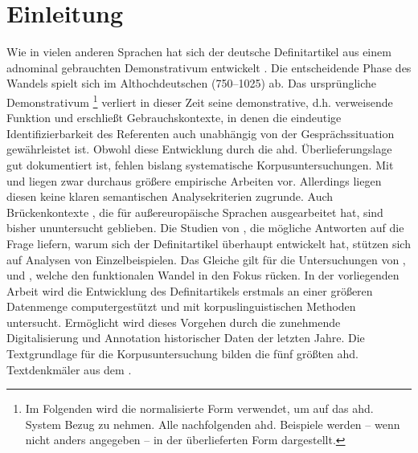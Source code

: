 \chapter{Einleitung}

Wie in vielen anderen Sprachen hat sich der deutsche Definitartikel aus einem adnominal gebrauchten Demonstrativum entwickelt  \parencite{Oubouzar1992,Szczepaniak2011a}. Die entscheidende Phase des Wandels spielt sich im Althochdeutschen (750--1025) ab. Das ursprüngliche Demonstrativum \footnote{Im Folgenden wird die normalisierte Form  verwendet, um auf das ahd. System Bezug zu nehmen. Alle nachfolgenden ahd. Beispiele werden -- wenn nicht anders angegeben -- in der überlieferten Form dargestellt.} verliert in dieser Zeit seine demonstrative, d.h. verweisende Funktion und erschließt Gebrauchskontexte, in denen die eindeutige Identifizierbarkeit des Referenten auch unabhängig von der Gesprächssituation gewährleistet ist. Obwohl diese Entwicklung durch die ahd. Überlieferungslage gut dokumentiert ist, fehlen bislang systematische Korpusuntersuchungen. Mit \textcite{Hodler1954} und \textcite{Oubouzar1989,Oubouzar1992,Oubouzar1997a} liegen zwar durchaus größere empirische Arbeiten vor. Allerdings liegen diesen keine klaren semantischen Analysekriterien zugrunde. Auch Brückenkontexte \parencite{Heine2002a}, die \textcite{Himmelmann1997} für außereuropäische Sprachen ausgearbeitet hat, sind bisher ununtersucht geblieben. Die Studien von \textcite{Abraham1997,Philippi1997,Leiss2000}, die mögliche Antworten auf die Frage liefern, warum sich der Definitartikel überhaupt entwickelt hat, stützen sich auf Analysen von Einzelbeispielen. Das Gleiche gilt für die Untersuchungen von \textcite{Demske2001}, \textcite{Kraiss2012,Kraiss2014} und \textcite{Schlachter2015}, welche den funktionalen Wandel in den Fokus rücken.
In der vorliegenden Arbeit wird die Entwicklung des Definitartikels erstmals an einer größeren Datenmenge computergestützt und mit korpuslinguistischen Methoden untersucht. Ermöglicht wird dieses Vorgehen durch die zunehmende Digitalisierung und Annotation historischer Daten der letzten Jahre. Die Textgrundlage für die Korpusuntersuchung bilden die fünf größten ahd. Textdenkmäler aus dem   \parencite{Donhauser2015}.

